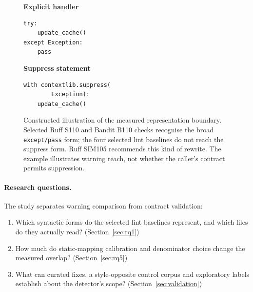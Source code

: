 \documentclass[10pt,a4paper]{article}
\begin{document}
\begin{figure}[htbp]
\centering\small
\begin{minipage}[t]{0.44\textwidth}
\textbf{Explicit handler}
\begin{verbatim}
try:
    update_cache()
except Exception:
    pass
\end{verbatim}
\end{minipage}
\hfill
\begin{minipage}[t]{0.48\textwidth}
\textbf{Suppress statement}
\begin{verbatim}
with contextlib.suppress(
        Exception):
    update_cache()
\end{verbatim}
\end{minipage}
\caption{Constructed illustration of the measured representation boundary.
Selected Ruff S110 and Bandit B110 checks recognise the broad
\texttt{except/pass} form; the four selected lint baselines do not reach
the suppress form. Ruff SIM105 recommends this kind of rewrite.
The example illustrates warning reach, not whether the caller's contract
permits suppression.}
\label{fig:suppression-form}
\end{figure}

\paragraph{Research questions.}
The study separates warning comparison from contract validation:
\begin{enumerate}[label=\textbf{RQ\arabic*},nosep,leftmargin=*]
\item Which syntactic forms do the selected lint baselines represent, and
  which files do they actually read? (Section~\ref{sec:rq1})
\item How much do static-mapping calibration and denominator choice change the
  measured overlap? (Section~\ref{sec:rq5})
\item What can curated fixes, a style-opposite control corpus and exploratory
  labels establish about the detector's scope? (Section~\ref{sec:validation})
\end{enumerate}
\end{document}
